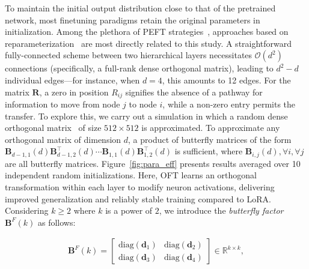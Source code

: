     \!\!\!\!\! To maintain the initial output distribution close to that of the pretrained network, most finetuning paradigms retain the original parameters in initialization. Among the plethora of PEFT strategies~\cite{houlsby2019parameter,aghajanyan2020intrinsic,hulora2022,edalati2022krona,wang2022adamix,gheini2021cross,zaken2022bitfit,guo2020parameter,sung2021training,ansell2022composable,lester2021power,li2021prefix,vu2022spot,he2021towards,mao2021unipelt,karimi2021compacter,liu2022few,sung2022lst,chen2022parameter,jia2022visual,chen2022adaptformer,zhang2022neural,jie2023fact,lian2022scaling,luo2023towards}, approaches based on reparameterization~\cite{aghajanyan2020intrinsic,hulora2022,edalati2022krona} are most directly related to this study. A straightforward fully-connected scheme between two hierarchical layers necessitates $\mathcal{O}(d^2)$ connections (specifically, a full-rank dense orthogonal matrix), leading to $d^2-d$ individual edges—for instance, when $d=4$, this amounts to 12 edges. For the matrix $\bm{R}$, a zero in position $R_{ij}$ signifies the absence of a pathway for information to move from node $j$ to node $i$, while a non-zero entry permits the transfer. To explore this, we carry out a simulation in which a random dense orthogonal matrix~\cite{anderson1987generation} of size $512\times 512$ is approximated. To approximate any orthogonal matrix of dimension $d$, a product of butterfly matrices of the form $\bm{B}_{d-1,1}(d)\bm{B}^\top_{d-1,2}(d)\cdots\bm{B}_{1,1}(d)\bm{B}^\top_{1,2}(d)$ is sufficient, where $\bm{B}_{i,j}(d), \forall i, \forall j$ are all butterfly matrices. Figure~\ref{fig:para_eff} presents results averaged over 10 independent random initializations. Here, OFT learns an orthogonal transformation within each layer to modify neuron activations, delivering improved generalization and reliably stable training compared to LoRA. Considering $k\geq 2$ where $k$ is a power of $2$, we introduce the \emph{butterfly factor} $\bm{B}^F(k)$ as follows:

\begin{equation}\label{eq:but_factor}
\begin{aligned}
    \bm{B}^F(k)=\begin{bmatrix}
    \text{diag}(\bm{d}_1) & \text{diag}(\bm{d}_2) \\
    \text{diag}(\bm{d}_3) & \text{diag}(\bm{d}_4)
    \end{bmatrix}\in\mathbb{R}^{k\times k},
\end{aligned}
\end{equation}

